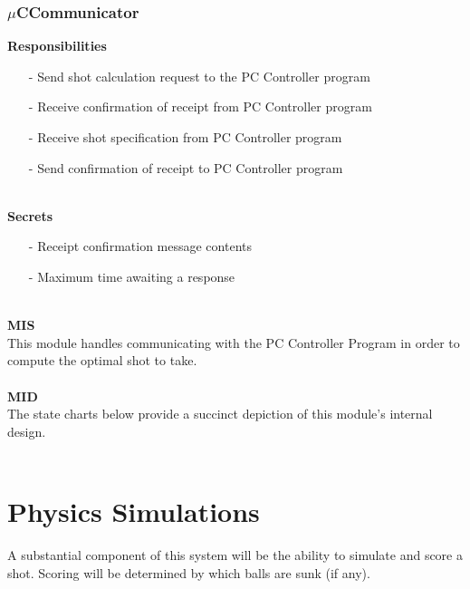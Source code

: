 \documentclass[titlepage]{article}
\begin{document}
\subsubsection{$\mu$CCommunicator}
\textbf{Responsibilities}
\begin{itemize}
	\item[-] Send shot calculation request to the PC Controller program
	\item[-] Receive confirmation of receipt from PC Controller program
	\item[-] Receive shot specification from PC Controller program
	\item[-] Send confirmation of receipt to PC Controller program 
\end{itemize}~\\
\textbf{Secrets}
\begin{itemize}
	\item[-] Receipt confirmation message contents
	\item[-] Maximum time awaiting a response
\end{itemize}~\\
\textbf{MIS}\\[2mm]
This module handles communicating with the PC Controller Program in order to compute the optimal shot to take.
\\\\
\textbf{MID}\\[2mm]
The state charts below provide a succinct depiction of this module's internal design.
\\\\

\section{Physics Simulations}
A substantial component of this system will be the ability to simulate and score a shot. Scoring will be determined by which balls are sunk (if any).
\end{document}
